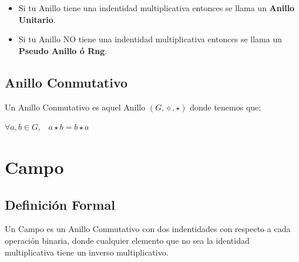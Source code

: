 \documentclass[12pt, fleqn]{report}                             %
\DeclareMathOperator \Space     {\quad}                         %
\DeclareMathOperator \MiniSpace {\;}                            %
\theoremstyle{break}                                            %
\begin{document}
                \small{

                    \begin{itemize}
                        \item Si tu Anillo tiene una indentidad multiplicativa entonces se llama
                            un \textbf{Anillo Unitario}.

                        \item Si tu Anillo NO tiene una indentidad multiplicativa entonces se llama
                            un \textbf{Pseudo Anillo ó Rng}.

                    \end{itemize}
                }




            \subsection{Anillo Conmutativo}

                Un Anillo Conmutativo es aquel Anillo $(G, \diamond, \star)$ donde tenemos que:

                $\forall a, b \in G, \MiniSpace a \star b = b \star a$
           


            

        \clearpage
        \section{Campo}

            \subsection{Definición Formal}

                Un Campo es un Anillo Conmutativo con dos indentidades con respecto a cada operación binaria,
                donde cualquier elemento que no sea la identidad multiplicativa tiene un inverso multiplicativo.
\end{document}
